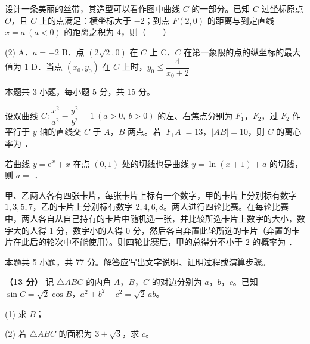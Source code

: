 设计一条美丽的丝带，其造型可以看作图中曲线 $C$ 的一部分。已知 $C$ 过坐标原点 $O$，且 $C$ 上的点满足：横坐标大于 $-2$；到点 $F(2,0)$ 的距离与到定直线 $x=a\ (a<0)$ 的距离之积为 $4$，则（　　）

\begin{center}\end{center}

\begin{gkopts}(2)
\task A．$a=-2$
\task B．点 $\left(2\sqrt2,0\right)$ 在 $C$ 上
\task C．$C$ 在第一象限的点的纵坐标的最大值为 $1$
\task D．当点 $\left(x_0,y_0\right)$ 在 $C$ 上时，$y_0\le\dfrac{4}{x_0+2}$
\end{gkopts}

\par\medskip


\begin{gktip}
本题共 3 小题，每小题 5 分，共 15 分。
\end{gktip}

设双曲线 $C:\dfrac{x^{2}}{a^{2}}-\dfrac{y^{2}}{b^{2}}=1\ (a>0,\ b>0)$ 的左、右焦点分别为 $F_1$，$F_2$，过 $F_2$ 作平行于 $y$ 轴的直线交 $C$ 于 $A$，$B$ 两点。若 $|F_1A|=13$，$|AB|=10$，则 $C$ 的离心率为 \gkblank{}．

若曲线 $y=\mathrm{e}^{x}+x$ 在点 $(0,1)$ 处的切线也是曲线 $y=\ln(x+1)+a$ 的切线，则 $a=$ \gkblank{}．

甲、乙两人各有四张卡片，每张卡片上标有一个数字，甲的卡片上分别标有数字 $1,3,5,7$，乙的卡片上分别标有数字 $2,4,6,8$。两人进行四轮比赛。在每轮比赛中，两人各自从自己持有的卡片中随机选一张，并比较所选卡片上数字的大小，数字大的人得 $1$ 分，数字小的人得 $0$ 分，然后各自弃置此轮所选的卡片（弃置的卡片在此后的轮次中不能使用）。则四轮比赛后，甲的总得分不小于 $2$ 的概率为 \gkblank{}．

\par\medskip


\begin{gktip}
本题共 5 小题，共 77 分。解答应写出文字说明、证明过程或演算步骤。
\end{gktip}

\textbf{（13 分）} 记 $\triangle ABC$ 的内角 $A$，$B$，$C$ 的对边分别为 $a$，$b$，$c$。已知 $\sin C=\sqrt2\cos B$，$a^{2}+b^{2}-c^{2}=\sqrt2\,ab$。

  (1) 求 $B$；

  (2) 若 $\triangle ABC$ 的面积为 $3+\sqrt3$，求 $c$。

